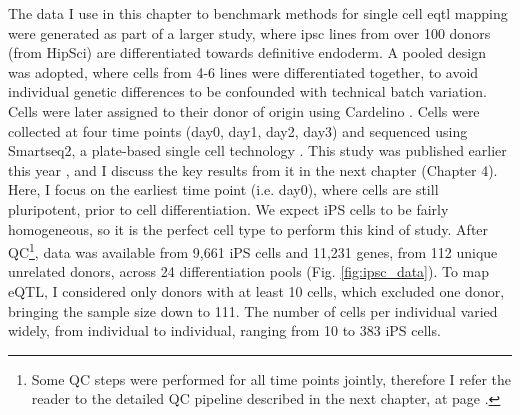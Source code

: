 The data I use in this chapter to benchmark methods for single cell \gls{eqtl} mapping 
were generated as part of a larger study, where \gls{ipsc} lines from over 100 donors (from HipSci) are differentiated towards definitive endoderm.
A pooled design was adopted, where cells from 4-6 lines were differentiated together, to avoid individual genetic differences to be confounded with technical batch variation. 
Cells were later assigned to their donor of origin using Cardelino \cite{mccarthy2020cardelino}. 
Cells were collected at four time points (day0, day1, day2, day3) and sequenced using Smartseq2, a plate-based single cell technology \cite{picelli2013smart}.
This study was published earlier this year \cite{cuomo2020single}, and I discuss the key results from it in the next chapter (Chapter 
4).
\\

Here,
I focus on the earliest time point (i.e. day0), where cells are still pluripotent, prior to cell differentiation.
We expect iPS cells to be fairly homogeneous, so it is the perfect cell type to perform this kind of study.
After QC\footnote{Some QC steps were performed for all time points jointly, therefore I refer the reader to the detailed QC pipeline described in the next chapter, at page \pageref{fig:endodiff_qc_workflow}.}, data was available from 9,661 iPS cells and 11,231 genes, from 112 unique unrelated donors, across 24 differentiation pools (Fig. \ref{fig:ipsc_data}). 
To map eQTL, I considered only donors with at least 10 cells, which excluded one donor, bringing the sample size down to 111.
The number of cells per individual varied widely, from individual to individual, ranging from 10 to 383 iPS cells.


